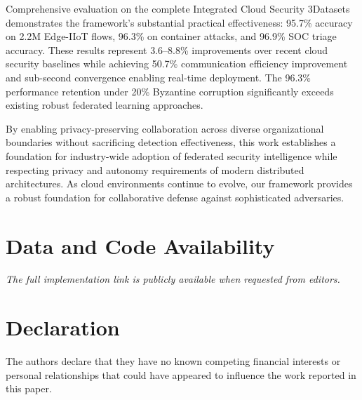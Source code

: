 \documentclass[12pt,a4paper]{article}
\theoremstyle{definition}
\begin{document}
Comprehensive evaluation on the complete Integrated Cloud Security 3Datasets demonstrates the framework's substantial practical effectiveness: 95.7\% accuracy on 2.2M Edge-IIoT flows, 96.3\% on container attacks, and 96.9\% SOC triage accuracy. These results represent 3.6--8.8\% improvements over recent cloud security baselines while achieving 50.7\% communication efficiency improvement and sub-second convergence enabling real-time deployment. The 96.3\% performance retention under 20\% Byzantine corruption significantly exceeds existing robust federated learning approaches.

By enabling privacy-preserving collaboration across diverse organizational boundaries without sacrificing detection effectiveness, this work establishes a foundation for industry-wide adoption of federated security intelligence while respecting privacy and autonomy requirements of modern distributed architectures. As cloud environments continue to evolve, our framework provides a robust foundation for collaborative defense against sophisticated adversaries.

\section*{Data and Code Availability}

\textit{The full implementation link is publicly available when requested from editors.}

\section*{Declaration}
The authors declare that they have no known competing financial interests or personal relationships that could have appeared to influence the work reported in this paper.
\end{document}
